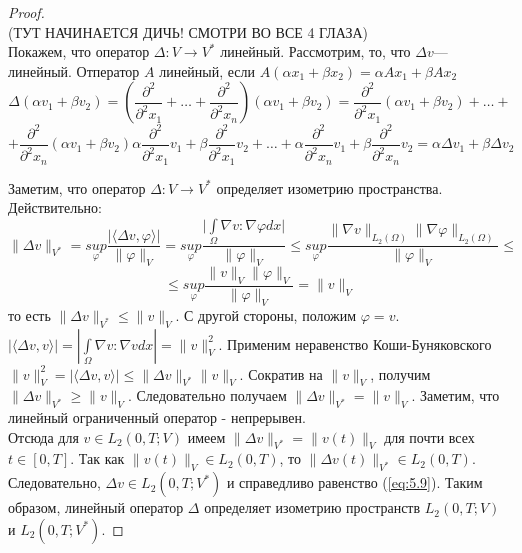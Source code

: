 \begin{proof} ~\\ (ТУТ НАЧИНАЕТСЯ ДИЧЬ! СМОТРИ ВО ВСЕ 4 ГЛАЗА)\\
        Покажем, что оператор $\Delta : V\rightarrow V^*$ линейный. 
        Рассмотрим, то, что $\Delta v$--- линейный. 
        Отператор $A$ линейный, если $A(\alpha x_1+\beta x_2)=\alpha Ax_1+\beta Ax_2$
        $$\Delta(\alpha v_1+\beta v_2)=(\frac{\partial^2}{\partial^2 x_1}+\ldots+\frac{\partial^2}{\partial^2 x_n})(\alpha v_1+\beta v_2)=
        \frac{\partial^2}{\partial^2 x_1}(\alpha v_1+\beta v_2)+\ldots+$$
        $$+\frac{\partial^2}{\partial^2 x_n}(\alpha v_1+\beta v_2)
        \alpha\frac{\partial^2}{\partial^2 x_1}v_1+\beta\frac{\partial^2}{\partial^2 x_1}v_2+\ldots+\alpha\frac{\partial^2}{\partial^2 x_n}v_1+\beta\frac{\partial^2}{\partial^2 x_n}v_2=
        \alpha\Delta v_1+\beta\Delta v_2$$

        Заметим, что оператор $\Delta : V\rightarrow V^*$ определяет изометрию пространства. Действительно:
        $$\| \Delta v \|_{V^*}=\underset{\varphi}{sup} \frac{|\langle \Delta v,\varphi \rangle|}{\| \varphi\|_V}=\underset{\varphi}{sup} 
        \frac{\bigg|\int\limits_{\Omega}\nabla v:\nabla\varphi dx\bigg|}{\| \varphi\|_V}\le
        \underset{\varphi}{sup} \frac{\|\nabla v\|_{L_2(\Omega)}\|\nabla \varphi\|_{L_2(\Omega)}}{\|\varphi\|_V}\le$$
        $$\le\underset{\varphi}{sup} \frac{\| v \|_{V} \| \varphi \|_{V}}{\| \varphi \|_{V}}=\| v \|_{V}$$
        то есть $\| \Delta v \|_{V^*}\le\| v \|_{V}.$ С другой стороны, положим $\varphi=v.$
        $|\langle \Delta v,v \rangle|=|\int\limits_{\Omega}\nabla v:\nabla v dx|=\|v\|_V^2.$
        Применим неравенство Коши-Буняковского $\|v\|_V^2=|\langle \Delta v,v\rangle|\le\|\Delta v\|_{V^*}\| v\|_{V}.$
        Сократив на $\|v\|_V$, получим $\|\Delta v\|_{V^*}\ge\|v\|_V.$
        Следовательно получаем $\|\Delta v\|_{V^*}=\|v\|_V.$
        Заметим, что линейный ограниченный оператор - непрерывен.\\

        Отсюда для $v \in L_2(0, T; V)$ имеем
        $\| \Delta v \|_{V^\ast} = \| v(t) \|_V$ для почти всех\linebreak$t \in [0, T]$. Так как $\| v(t) \|_V \in L_2(0, T)$,
        то $\| \Delta v(t)\|_{V^*} \in L_2(0, T)$. Следовательно, $\Delta v \in L_2(0, T; V^\ast)$ и справедливо
        равенство (\ref{eq:5.9}). Таким образом, линейный оператор $\Delta$ определяет изометрию пространств $L_2(0, T; V)$ и $L_2(0, T; V^\ast)$.
        

\end{proof}
